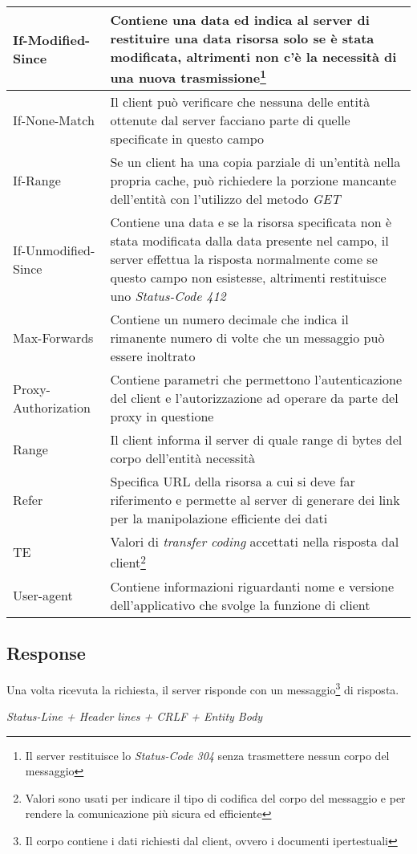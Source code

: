 \documentclass[a4paper,11pt]{article}
\begin{document}
\begin{center}
\begin{longtable}{l|p{}}
        \hline
        If-Modified-Since & Contiene una data ed indica al server di restituire una data risorsa solo se è stata modificata, altrimenti non c’è la necessità di una nuova trasmissione\footnote{Il server restituisce lo \textit{Status-Code 304} senza trasmettere nessun corpo del messaggio}\\
        \hline
        If-None-Match & Il client può verificare che nessuna delle entità ottenute dal server facciano parte di quelle specificate in questo campo\\
        \hline
        If-Range & Se un client ha una copia parziale di un’entità nella propria cache, può richiedere la porzione mancante dell’entità con l'utilizzo del metodo \textit{GET}\\
        \hline
        If-Unmodified-Since & Contiene una data e se la risorsa specificata non è stata modificata dalla data presente nel campo, il server effettua la risposta normalmente come se questo campo non esistesse, altrimenti restituisce uno \textit{Status-Code 412}\\
        \hline
        Max-Forwards & Contiene un numero decimale che indica il rimanente numero di volte che un messaggio può essere inoltrato\\
        \hline
        Proxy-Authorization & Contiene parametri che permettono l’autenticazione del client e l'autorizzazione ad operare da parte del proxy in questione\\
        \hline
        Range & Il client informa il server di quale range di bytes del corpo dell’entità necessità\\
        \hline
        Refer & Specifica URL della risorsa a cui si deve far riferimento e permette al server di generare dei link per la manipolazione efficiente dei dati\\
        \hline
        TE & Valori di \textit{transfer coding} accettati nella risposta dal client\footnote{Valori sono usati per indicare il tipo di codifica del corpo del messaggio e per rendere la comunicazione più sicura ed efficiente}\\
        \hline
        User-agent & Contiene informazioni riguardanti nome e versione dell’applicativo che svolge la funzione di client\\
    \end{longtable}
\end{center}
\subsection{Response}
Una volta ricevuta la richiesta, il server risponde con un messaggio\footnote{Il corpo contiene i dati richiesti dal client, ovvero i documenti ipertestuali} di risposta.\bigbreak
\centerline{\textit{Status-Line + Header lines + CRLF + Entity Body}}
\end{document}
